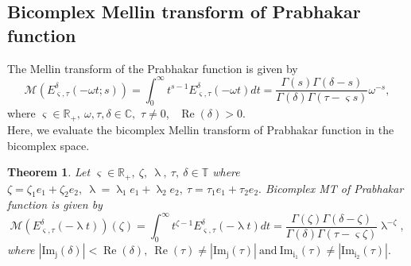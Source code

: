 \documentclass[a4paper,12pt]{article}
\newtheorem{theorem}{Theorem}[section]
\theoremstyle{remark}
\begin{document}
\subsection{Bicomplex Mellin transform of Prabhakar function}
The Mellin transform of the Prabhakar function is given by \cite{gorenflo2014}
\begin{equation}\label{eq mt 3 para}
\mathcal{M}(E_{ \varsigma,\tau}^\delta( -\omega t;s))=\int_{0}^{\infty}t^{s-1}E_{ \varsigma, \tau}^\delta(-\omega t)dt=\frac{\Gamma(s)\Gamma(\delta-s)}{\Gamma(\delta)\Gamma(\tau- \varsigma s)}\omega^{-s},
\end{equation}
where $ \varsigma\in \mathbb{R}_+, ~\omega,\tau,\delta\in \mathbb{C},$  {$\tau\neq 0$},~ $\operatorname{Re}(\delta) > 0.$\\

\noindent Here, we evaluate the bicomplex Mellin transform of Prabhakar function in the bicomplex space.
\begin{theorem}\label{th:mt three para}
	Let $ \varsigma\in \mathbb{R}_+,~\zeta,~\uplambda ,~\tau,~\delta\in \mathds{T} $ where $\zeta=\zeta_1e_1+\zeta_2e_2, ~\uplambda =\uplambda _1e_1+\uplambda _2e_2,~\tau=\tau_1e_1+\tau_2e_2 .$ Bicomplex
MT of Prabhakar function	is given by 
\begin{equation}\label{eq mt 3 para 1}
\mathcal{M}(E_{ \varsigma,\tau}^\delta( -\uplambda t))(\zeta)=\int_{0}^{\infty}t^{\zeta-1}E_{ \varsigma, \tau}^\delta(-\uplambda t)dt=\frac{\Gamma(\zeta)\Gamma(\delta-\zeta)}{\Gamma(\delta)\Gamma(\tau- \varsigma \zeta)}\uplambda ^{-\zeta},
\end{equation}
where	
	$|\operatorname{Im_j}(\delta)|<\operatorname{Re}(\delta), ~ \operatorname{Re}(\tau)\neq |\operatorname{Im_j}(\tau)|~\text{and}~ \operatorname{Im_{i_1}}(\tau)\neq |\operatorname{Im_{i_2}}(\tau)|.$\\
	
\end{theorem}
\end{document}
